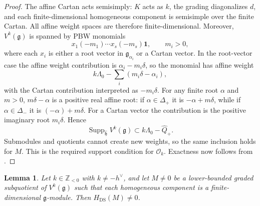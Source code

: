 \documentclass[11pt]{article}
\newtheorem{lemma}[theorem]{Lemma}
\newcommand{\g}{\mathfrak g}
\newcommand{\cO}{\mathcal O}
\begin{document}
\begin{proof}
The affine Cartan acts semisimply: $K$ acts as $k$, the grading diagonalizes
$d$, and each finite-dimensional homogeneous component is semisimple over the
finite Cartan.  All affine weight spaces are therefore finite-dimensional.
Moreover, $V^k(\g)$ is spanned by PBW monomials
$$
 x_1(-m_1)\cdots x_s(-m_s)\mathbf1,
 \qquad m_i>0,
$$
where each $x_i$ is either a root vector in $\g_{\alpha_i}$ or a Cartan
vector.  In the root-vector case the affine weight contribution is
$\alpha_i-m_i\delta$, so the monomial has affine weight
$$
 k\Lambda_0-\sum_i(m_i\delta-\alpha_i),
$$
with the Cartan contribution interpreted as $-m_i\delta$.  For any finite
root $\alpha$ and $m>0$, $m\delta-\alpha$ is a positive real affine root:
if $\alpha\in\Delta_+$ it is $-\alpha+m\delta$, while if
$\alpha\in\Delta_-$ it is $(-\alpha)+m\delta$.  For a Cartan vector the
contribution is the positive imaginary root $m_i\delta$.  Hence
$$
 \operatorname{Supp}_{\widehat{\mathfrak h}}V^k(\g)
 \subset k\Lambda_0-\widehat Q_+.
$$
Submodules and quotients cannot create new weights, so the same inclusion
holds for $M$.  This is the required support condition for $\cO_k$.
Exactness now follows from \cite[Corollary~6.7.3]{Arakawa2005}.
\end{proof}

\begin{lemma}\label{lem:detection}
Let $k\in\mathbb Z_{<0}$ with $k\ne-h^\vee$, and let $M\neq0$ be a
lower-bounded graded subquotient of $V^k(\g)$ such that each homogeneous
component is a finite-dimensional $\g$-module.  Then
$H_{\mathrm{DS}}(M)\neq0$.
\end{lemma}
\end{document}
